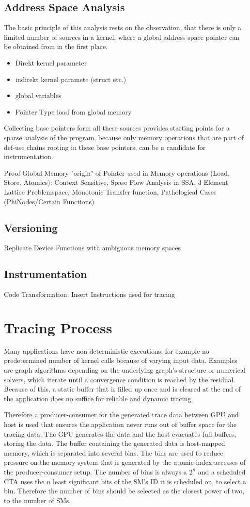 \subsection{Address Space Analysis}\label{pa}
The basic principle of this analysis rests on the observation, that there is only a limited number of sources in
a kernel, where a global address space pointer can be obtained from in the first place.
\begin{itemize}
	\item Direkt kernel parameter
	\item indirekt kernel paramete (struct etc.)
	\item global variables
	\item Pointer Type load from global memory
\end{itemize}
Collecting base pointers form all these sources provides starting points for a sparse analysis of the program,
because only memory operations that are part of def-use chains rooting in these base pointers, can be a candidate for instrumentation.


 Proof Global Memory "origin" of Pointer used in Memory operations (Load, Store, Atomics): Context Sensitive, Spase Flow Analysis in SSA, 3 Element Lattice Problemspace, Monotonic Transfer function, Pathological Cases (PhiNodes/Certain Functions)
\subsection{Versioning}\label{vers}
Replicate Device Functions with ambiguous memory spaces
\subsection{Instrumentation}\label{vers}
Code Transformation: Insert Instructions used for tracing

\section{Tracing Process}
	Many applications have non-deterministic executions, for example no predetermined number of kernel calls because of varying input data. Examples are graph algorithms depending on the underlying graph's structure or numerical solvers, which iterate until a
	convergence condition is reached by the residual. Because of this, a static buffer that is filled up once and is cleared at the end of the application does no suffice for reliable and dynamic tracing.
	
	Therefore a producer-consumer for the generated trace data between GPU and host is used that ensures the application never runs out of buffer space for the tracing data. The GPU generates the data and the host evacuates full buffers, storing the data.
	The buffer containing the generated data is host-mapped memory, which is separated into several bins. The bins are used to reduce
	pressure on the memory system that is generated by the atomic index accesses of the producer-consumer setup. The number of bins 
	is always a $2^n$ and a scheduled CTA uses the  $n$ least significant bits of the SM's ID it is scheduled on, to select a bin. Therefore the number of bins should be selected as the closest power of two, to the number of SMs.

